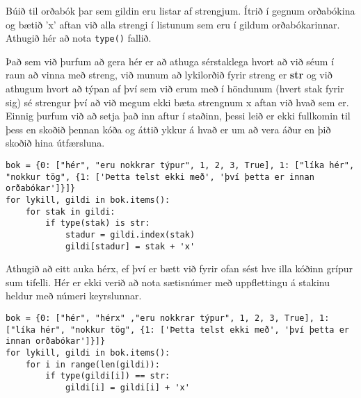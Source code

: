 \begin{exercise}\label{dic5}
Búið til orðabók þar sem gildin eru listar af strengjum.
Ítrið í gegnum orðabókina og bætið 'x' aftan við alla strengi í listunum sem eru í gildum  orðabókarinnar.
Athugið hér að nota \texttt{type()} fallið.
\end{exercise}
\begin{Answer}[ref={dic5}]
Það sem við þurfum að gera hér er að athuga sérstaklega hvort að við séum í raun að vinna með streng, við munum að lykilorðið fyrir streng er \textbf{str} og við athugum hvort að týpan af því sem við erum með í höndunum (hvert stak fyrir sig) sé strengur því að við megum ekki bæta strengnum x aftan við hvað sem er.
Einnig þurfum við að setja það inn aftur í staðinn, þessi leið er ekki fullkomin til þess en skoðið þennan kóða og áttið ykkur á hvað er um að vera áður en þið skoðið hina útfærsluna.
	\begin{lstlisting}
bok = {0: ["hér", "eru nokkrar týpur", 1, 2, 3, True], 1: ["líka hér", "nokkur tög", {1: ['Þetta telst ekki með', 'því þetta er innan orðabókar']}]}
for lykill, gildi in bok.items():
	for stak in gildi:
		if type(stak) is str:
			stadur = gildi.index(stak)
			gildi[stadur] = stak + 'x'\end{lstlisting}
Athugið að eitt auka hérx, ef því er bætt við fyrir ofan sést hve illa kóðinn grípur sum tifelli.
Hér er ekki verið að nota sætisnúmer með uppflettingu á stakinu heldur með númeri keyrslunnar.
\begin{lstlisting}
bok = {0: ["hér", "hérx" ,"eru nokkrar týpur", 1, 2, 3, True], 1: ["líka hér", "nokkur tög", {1: ['Þetta telst ekki með', 'því þetta er innan orðabókar']}]}
for lykill, gildi in bok.items():
	for i in range(len(gildi)):
		if type(gildi[i]) == str:
			gildi[i] = gildi[i] + 'x'\end{lstlisting}
\end{Answer}

